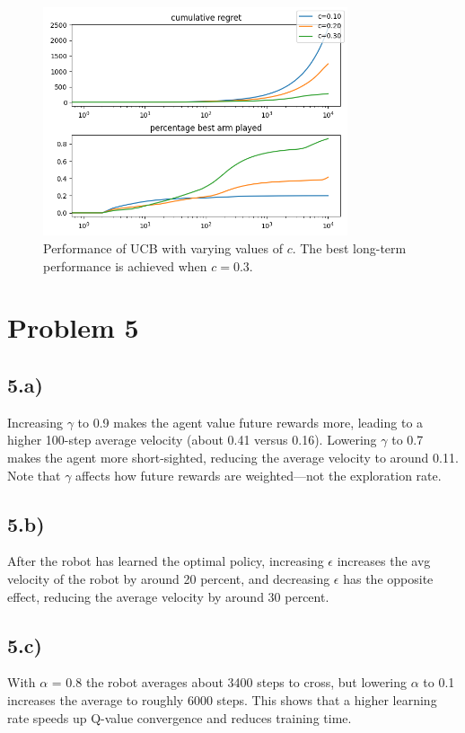 \documentclass[11pt]{article}
\begin{document}
\begin{figure}[htbp]
\centering
\includegraphics[width=0.8\textwidth]{images/Figure_7.png}
\caption{Performance of UCB with varying values of $c$. The best long-term performance is achieved when $c = 0.3$.}
\label{fig:ucb_four_k}
\end{figure}

\section*{Problem 5}
\subsection*{5.a)}

Increasing $\gamma$ to 0.9 makes the agent value future rewards more, leading to a higher 100-step average velocity (about 0.41 versus 0.16). Lowering $\gamma$
to 0.7 makes the agent more short-sighted, reducing the average velocity to around 0.11. Note that $\gamma$ affects how future rewards are weighted—not
the exploration rate.

\subsection*{5.b)}
After the robot has learned the optimal policy, increasing $\epsilon$ increases the avg velocity of the robot by around 20 percent, and decreasing $\epsilon$ has the opposite effect, reducing the average velocity by around 30 percent.

\subsection*{5.c)}
With $\alpha$ = 0.8 the robot averages about 3400 steps to cross, but lowering $\alpha$ to 0.1 increases the average to roughly 6000 steps. This shows that a higher learning rate speeds up Q-value convergence and reduces training time.
\end{document}

